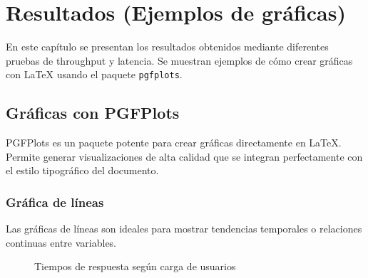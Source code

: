 \chapter{Resultados (Ejemplos de gráficas)}
\label{ch:resultados}

En este capítulo se presentan los resultados obtenidos mediante diferentes pruebas de \gls{throughput} y \gls{latencia}. Se muestran ejemplos de cómo crear gráficas con \LaTeX{} usando el paquete \texttt{pgfplots}.

\section{Gráficas con PGFPlots}
\label{sec:graficas-pgfplots}

PGFPlots es un paquete potente para crear gráficas directamente en \LaTeX{}. Permite generar visualizaciones de alta calidad que se integran perfectamente con el estilo tipográfico del documento.

\subsection{Gráfica de líneas}
\label{subsec:grafica-lineas}

Las gráficas de líneas son ideales para mostrar tendencias temporales o relaciones continuas entre variables.

\begin{figure}[H]
  \centering
  \caption{Tiempos de respuesta según carga de usuarios}
  \label{fig:rendimiento}
\end{figure}

